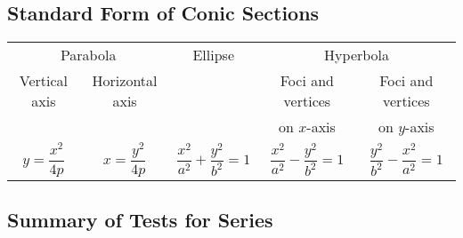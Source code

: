 \subsection*{Standard Form of Conic Sections}

{\addtolength{\tabcolsep}{6pt}
\begin{tabular}{ccccc}
\multicolumn{2}{c}{Parabola} & \hspace{5em}Ellipse\hspace{5em} & \multicolumn{2}{c}{Hyperbola} \\
Vertical axis & Horizontal axis & & Foci and vertices & Foci and vertices \\
& & & on $x$-axis & on $y$-axis \\
$y=\dfrac{x^2}{4p}$ & $x=\dfrac{y^2}{4p}$ & $\dfrac{x^2}{a^2}+\dfrac{y^2}{b^2}=1$ & $\dfrac{x^2}{a^2}-\dfrac{y^2}{b^2}=1$ & $\dfrac{y^2}{b^2}-\dfrac{x^2}{a^2}=1$
\end{tabular}}

\clearpage

\subsection*{Summary of Tests for Series}\label{tab_series_tests}

